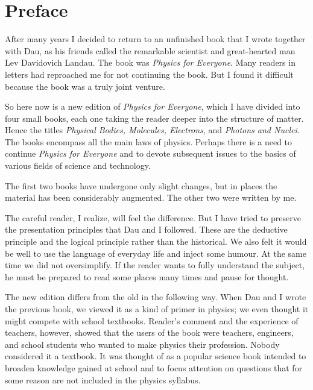 

\chapter*{Preface}

After many years I decided to return to an unfinished book that I
wrote together with Dau, as his friends called the remarkable
scientist and great-hearted man Lev Davidovich Landau. The book was
\emph{Physics for Everyone}.  Many readers in letters had reproached
me for not continuing the book. But I found it difficult because the
book was a truly joint venture.

So here now is a new edition of \emph{Physics for Everyone}, which I
have divided into four small books, each one taking the reader deeper
into the structure of matter.  Hence the titles \emph{Physical Bodies,
  Molecules, Electrons}, and \emph{Photons and Nuclei}. The books
encompass all the main laws of physics. Perhaps there is a need to
continue \emph{Physics for Everyone} and to devote subsequent issues
to the basics of various fields of science and technology.  

The first two books have undergone only slight changes, but in places
the material has been considerably augmented. The other two were
written by me.  

The careful reader, I realize, will feel the difference.  But I have
tried to preserve the presentation principles that Dau and I
followed. These are the deductive principle and the logical principle
rather than the historical. We also felt it would be well to use the
language of everyday life and inject some humour. At the same time
we did not oversimplify. If the reader wants to fully understand the
subject, he must be prepared to read some places many times and
pause for thought.

The new edition differs from the old in the following way. When Dau
and I wrote the previous book, we viewed it as a kind of primer in
physics; we even thought it might compete with school
textbooks. Reader's comment and the experience of teachers, however,
showed that the users of the book were teachers, engineers, and school
students who wanted to make physics their profession.  Nobody
considered it a textbook. It was thought of as a popular science book
intended to broaden knowledge gained at school and to focus attention
on questions that for some reason are not included in the physics
syllabus.  

